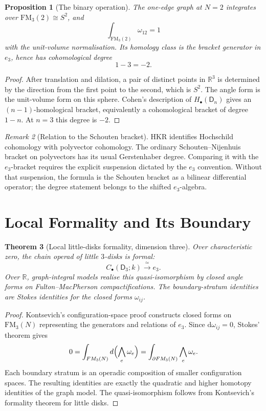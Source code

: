 \documentclass[11pt]{amsart}
\newtheorem{theorem}{Theorem}[section]
\newtheorem{proposition}[theorem]{Proposition}
\theoremstyle{definition}
\theoremstyle{remark}
\newtheorem{remark}[theorem]{Remark}
\providecommand{\RR}{\mathbb{R}}
\providecommand{\FM}{\mathrm{FM}}
\providecommand{\dd}{\mathrm{d}}
\begin{document}
\begin{proposition}[The binary operation]
\label{prop:binary-operation}
The one-edge graph at \(N=2\) integrates over
\(\FM_3(2)\cong S^2\), and
\[
  \int_{\FM_3(2)}\omega_{12}=1
\]
with the unit-volume normalisation.  Its homology class is the bracket
generator in \(e_3\), hence has cohomological degree
\[
  1-3=-2.
\]
\end{proposition}

\begin{proof}
After translation and dilation, a pair of distinct points in \(\RR^3\)
is determined by the direction from the first point to the second,
which is \(S^2\).  The angle form is the unit-volume form on this
sphere.  Cohen's description of \(H_\bullet(\mathsf{D}_n)\) gives an
\((n-1)\)-homological bracket, equivalently a cohomological bracket of
degree \(1-n\).  At \(n=3\) this degree is \(-2\).
\end{proof}

\begin{remark}[Relation to the Schouten bracket]
\label{rem:schouten-degree}
HKR identifies Hochschild cohomology with polyvector cohomology.  The
ordinary Schouten--Nijenhuis bracket on polyvectors has its usual
Gerstenhaber degree.  Comparing it with the \(e_3\)-bracket requires the
explicit suspension dictated by the \(e_3\) convention.  Without that
suspension, the formula is the Schouten bracket as a bilinear
differential operator; the degree statement belongs to the shifted
\(e_3\)-algebra.
\end{remark}

\section{Local Formality and Its Boundary}
\label{sec:local-formality}

\begin{theorem}[Local little-disks formality, dimension three]
\label{thm:local-e3-formality}
Over characteristic zero, the chain operad of little \(3\)-disks is
formal:
\[
  C_\bullet(\mathsf{D}_3;k)\xrightarrow{\;\simeq\;}e_3.
\]
Over \(\RR\), graph-integral models realise this quasi-isomorphism by
closed angle forms on Fulton--MacPherson compactifications.  The
boundary-stratum identities are Stokes identities for the closed forms
\(\omega_{ij}\).
\end{theorem}

\begin{proof}
Kontsevich's configuration-space proof constructs closed forms on
\(\FM_3(N)\) representing the generators and relations of \(e_3\).
Since \(\dd\omega_{ij}=0\), Stokes' theorem gives
\[
  0=\int_{\FM_3(N)}\dd\Bigl(\bigwedge_e\omega_e\Bigr)
   =\int_{\partial\FM_3(N)}\bigwedge_e\omega_e.
\]
Each boundary stratum is an operadic composition of smaller
configuration spaces.  The resulting identities are exactly the
quadratic and higher homotopy identities of the graph model.  The
quasi-isomorphism follows from Kontsevich's formality theorem for
little disks.
\end{proof}
\end{document}
